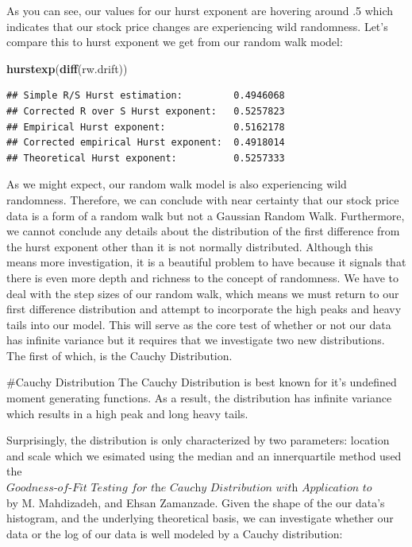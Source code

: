 \documentclass[]{article}
\newenvironment{Shaded}{\begin{snugshade}}{\end{snugshade}}
\newcommand{\KeywordTok}[1]{\textcolor[rgb]{0.13,0.29,0.53}{\textbf{#1}}}
\newcommand{\NormalTok}[1]{#1}
\begin{document}
As you can see, our values for our hurst exponent are hovering around .5
which indicates that our stock price changes are experiencing wild
randomness. Let's compare this to hurst exponent we get from our random
walk model:

\begin{Shaded}
\begin{Highlighting}[]
\KeywordTok{hurstexp}\NormalTok{(}\KeywordTok{diff}\NormalTok{(rw.drift))}
\end{Highlighting}
\end{Shaded}

\begin{verbatim}
## Simple R/S Hurst estimation:         0.4946068 
## Corrected R over S Hurst exponent:   0.5257823 
## Empirical Hurst exponent:            0.5162178 
## Corrected empirical Hurst exponent:  0.4918014 
## Theoretical Hurst exponent:          0.5257333
\end{verbatim}

As we might expect, our random walk model is also experiencing wild
randomness. Therefore, we can conclude with near certainty that our
stock price data is a form of a random walk but not a Gaussian Random
Walk. Furthermore, we cannot conclude any details about the distribution
of the first difference from the hurst exponent other than it is not
normally distributed. Although this means more investigation, it is a
beautiful problem to have because it signals that there is even more
depth and richness to the concept of randomness. We have to deal with
the step sizes of our random walk, which means we must return to our
first difference distribution and attempt to incorporate the high peaks
and heavy tails into our model. This will serve as the core test of
whether or not our data has infinite variance but it requires that we
investigate two new distributions. The first of which, is the Cauchy
Distribution.

\#Cauchy Distribution The Cauchy Distribution is best known for it's
undefined moment generating functions. As a result, the distribution has
infinite variance which results in a high peak and long heavy tails.

Surprisingly, the distribution is only characterized by two parameters:
location and scale which we esimated using the median and an
innerquartile method used the
\(\textit{Goodness-of-Fit Testing for the Cauchy Distribution with Application to Financial Modeling}\)
by M. Mahdizadeh, and Ehsan Zamanzade. Given the shape of the our data's
histogram, and the underlying theoretical basis, we can investigate
whether our data or the log of our data is well modeled by a Cauchy
distribution:
\end{document}
